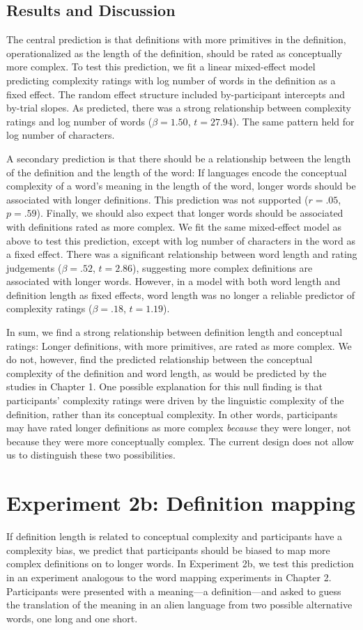 \subsection{Results and Discussion}
The central prediction is that definitions with more primitives in the definition, operationalized as the length of the definition, should be rated as conceptually more complex. To test this prediction, we fit a linear mixed-effect model predicting complexity ratings with log number of words in the definition as a fixed effect. The random effect structure included by-participant intercepts and by-trial slopes. As predicted, there was a strong relationship between complexity ratings and log number of words ($\beta=1.50$, $t =27.94$). The same pattern held for log number of characters.

A secondary prediction is that there should be a relationship between the length of the definition and the length of the word: If languages encode the conceptual complexity of a word's meaning in the length of the word, longer words should be associated with longer definitions. This prediction was not supported ($r=.05$, $p =.59$). Finally, we should also expect that  longer words should be associated with definitions rated as more complex. We fit the same mixed-effect model as above to test this prediction, except with log number of characters in the word as a fixed effect. There was a significant relationship between word length and rating judgements ($\beta=.52$, $t =2.86$), suggesting more complex definitions are associated with longer words. However, in a model with both word length and definition length as fixed effects, word length was no longer a reliable predictor of complexity ratings ($\beta=.18$, $t =1.19$).

In sum, we find a strong relationship between definition length and conceptual ratings: Longer definitions, with more primitives, are rated as more complex. We do not, however, find the predicted relationship between the conceptual complexity of the definition and word length, as would be predicted by the studies in Chapter 1.  One possible explanation for this null finding is that participants' complexity ratings were driven by the linguistic complexity of the definition, rather than its conceptual complexity. In other words, participants may have  rated longer definitions as more complex {\it because} they were longer, not because they were more conceptually complex. The current design does not allow us to distinguish these two possibilities.

\section{Experiment 2b: Definition mapping}
If definition length is related to conceptual complexity and participants have a complexity bias, we predict that participants should be biased to map more complex definitions on to longer words. In Experiment 2b, we test this prediction in an experiment analogous to the word mapping experiments in Chapter 2. Participants were presented with a meaning---a definition---and asked to guess the translation of the meaning in an alien language from two possible alternative words, one long and one short. 

